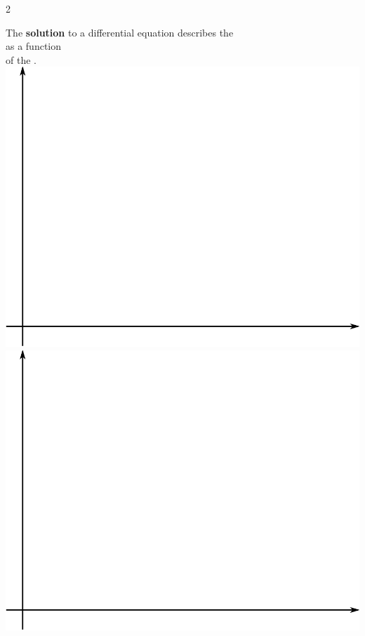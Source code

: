 \documentclass[fleqn]{beamer} %
\newcommand{\sectionIsubsectionIVtitle}{}
\begin{document}
 			\begin{frame}
 				\frametitle{\sectionIsubsectionIVtitle}
 				\bigskip

				\begin {multicols}{2}

The {\bf solution} to a differential equation describes the \vspace{2mm}\\ \underline{\hspace{40mm}}\hspace{2mm}\underline{\hspace{40mm}} as a function \vspace{2mm}\\of the \underline{\hspace{40mm}}\hspace{2mm}\underline{\hspace{40mm}}.  \vspace{5mm}\\


	\includegraphics[scale=0.10]{images/lecture1_fig2.png} \hspace{10mm} \includegraphics[scale=0.10]{images/lecture1_fig2.png}\vspace{2mm}\\
	

\end{multicols}
\end{frame}
\end{document}
